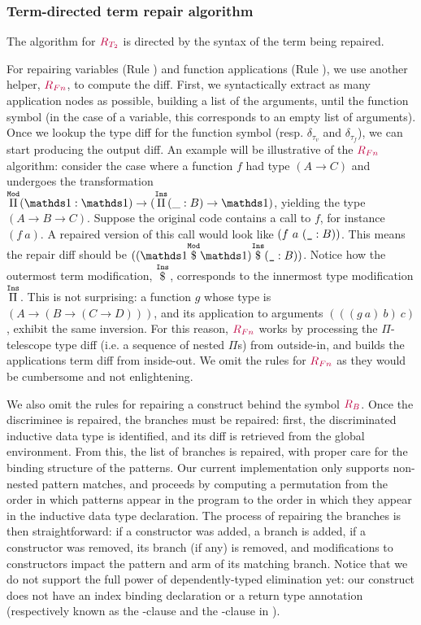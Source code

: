 \subsubsection*{Term-directed term repair algorithm}

The algorithm for $\textcolor{purple}{R_{T_2}}$ is directed by the syntax of the term
being repaired.

For repairing variables (Rule ) and function applications
(Rule ), we use another helper, $\textcolor{purple}{R_{Fn}}$, to compute
the diff.  First, we syntactically extract as many application nodes as
possible, building a list of the arguments, until the function symbol (in the
case of a variable, this corresponds to an empty list of arguments).  Once we
lookup the type diff for the function symbol (resp. $\delta_{\tau_v}$ and
$\delta_{\tau_f}$), we can start producing the output diff.  An example will be
illustrative of the $\textcolor{purple}{R_{Fn}}$ algorithm: consider the case where a
function $f$ had type $(A \rightarrow C)$ and undergoes the transformation
$\MathModPi{\MathSame}{\MathSame}{(\MathInsPi{B}{\_}{\MathSame})}$, yielding the
type $(A \rightarrow B \rightarrow C)$.  Suppose the original code contains a
call to $f$, for instance $(f\ a)$.  A repaired version of this call would look
like $(f\ a\ (\texttt{\_} : B))$.  This means the repair diff should be
$(\MathInsApp{(\MathModApp{\MathSame}{\MathSame})}{(\MathAnnot{\MathHole}{B})})$.
Notice how the outermost term modification, $\overset{\mathtt{Ins}}{\$}$, corresponds to the
innermost type modification $\overset{\mathtt{Ins}}{\Pi}$.  This is not surprising: a function
$g$ whose type is $(A \rightarrow (B \rightarrow (C \rightarrow D)))$, and its
application to arguments $(((g\ a)\ b)\ c)$, exhibit the same inversion.  For
this reason, $\textcolor{purple}{R_{Fn}}$ works by processing the $\Pi$-telescope type diff
(i.e. a sequence of nested $\Pi$s) from outside-in, and builds the applications
term diff from inside-out.  We omit the rules for $\textcolor{purple}{R_{Fn}}$ as they would
be cumbersome and not enlightening.

We also omit the rules for repairing a  construct behind the
symbol $\textcolor{purple}{R_{B}}$.  Once the discriminee is repaired, the branches must
be repaired: first, the discriminated inductive data type is identified, and its
diff is retrieved from the global environment.  From this, the list of branches
is repaired, with proper care for the binding structure of the patterns.  Our
current implementation only supports non-nested pattern matches, and proceeds by
computing a permutation from the order in which patterns appear in the program
to the order in which they appear in the inductive data type declaration.  The
process of repairing the branches is then straightforward: if a constructor was
added, a branch is added, if a constructor was removed, its branch (if any) is
removed, and modifications to constructors impact the pattern and arm of its
matching branch.  Notice that we do not support the full power of
dependently-typed elimination yet: our  construct does not have
an index binding declaration or a return type annotation (respectively known as
the -clause and the -clause in \Gallina{}).

